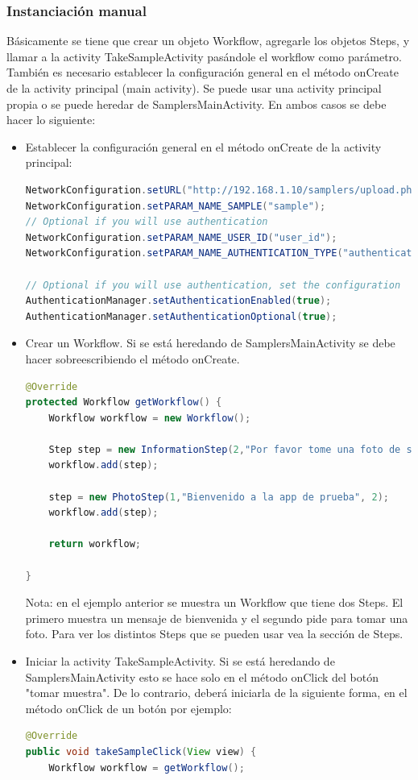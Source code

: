 \subsubsection{Instanciación manual}
Básicamente se tiene que crear un objeto Workflow, agregarle los objetos Steps, y llamar a la activity TakeSampleActivity pasándole el workflow como parámetro.
También es necesario establecer la configuración general en el método onCreate de la activity principal (main activity).
Se puede usar una activity principal propia o se puede heredar de SamplersMainActivity. En ambos casos se debe hacer lo siguiente:
\begin{itemize}
	\item Establecer la configuración general en el método onCreate de la activity principal:
		\begin{lstlisting}[language=Java, frame=tlb]
NetworkConfiguration.setURL("http://192.168.1.10/samplers/upload.php");
NetworkConfiguration.setPARAM_NAME_SAMPLE("sample");
// Optional if you will use authentication
NetworkConfiguration.setPARAM_NAME_USER_ID("user_id");
NetworkConfiguration.setPARAM_NAME_AUTHENTICATION_TYPE("authentication_type");

// Optional if you will use authentication, set the configuration
AuthenticationManager.setAuthenticationEnabled(true);
AuthenticationManager.setAuthenticationOptional(true);
		\end{lstlisting}

	\item Crear un Workflow. Si se está heredando de SamplersMainActivity se debe hacer sobreescribiendo el método onCreate.
		\begin{lstlisting}[language=Java, frame=tlb]
@Override
protected Workflow getWorkflow() {
	Workflow workflow = new Workflow();
    	
	Step step = new InformationStep(2,"Por favor tome una foto de su gato", null);
	workflow.add(step);
    	
	step = new PhotoStep(1,"Bienvenido a la app de prueba", 2);
	workflow.add(step);
    	
	return workflow;
    	
}		
		\end{lstlisting}
Nota: en el ejemplo anterior se muestra un Workflow que tiene dos Steps. El primero muestra un mensaje de bienvenida y el segundo pide para tomar una foto. Para ver los distintos Steps que se pueden usar vea la sección de Steps.

	\item Iniciar la activity TakeSampleActivity. Si se está heredando de SamplersMainActivity esto se hace solo en el método onClick del botón "tomar muestra". De lo contrario, deberá iniciarla de la siguiente forma, en el método onClick de un botón por ejemplo:
		\begin{lstlisting}[language=Java, frame=tlb]
@Override
public void takeSampleClick(View view) {
	Workflow workflow = getWorkflow();


\end{lstlisting}
\end{itemize}
